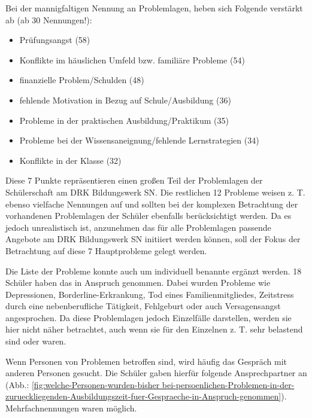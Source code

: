 \noindent
Bei der mannigfaltigen Nennung an Problemlagen, heben sich Folgende verstärkt ab (ab 30 Nennungen!): 

\begin{itemize}
	\item Prüfungsangst (58)
	\item Konflikte im häuslichen Umfeld bzw. familiäre Probleme (54)
	\item finanzielle Problem/Schulden (48)
	\item fehlende Motivation in Bezug auf Schule/Ausbildung (36)
	\item Probleme in der praktischen Ausbildung/Praktikum (35)
	\item Probleme bei der Wissensaneignung/fehlende Lernstrategien (34)
	\item Konflikte in der Klasse (32)
\end{itemize}

\noindent
Diese 7 Punkte repräsentieren einen großen Teil der Problemlagen der Schülerschaft am DRK Bildungswerk SN. Die restlichen 12 Probleme weisen z. T. ebenso vielfache Nennungen auf und sollten bei der komplexen Betrachtung der vorhandenen Problemlagen der Schüler ebenfalls berücksichtigt werden. Da es jedoch unrealistisch ist, anzunehmen das für alle Problemlagen passende Angebote am DRK Bildungswerk SN initiiert werden können, soll der Fokus der Betrachtung auf diese 7 Hauptprobleme gelegt werden.

Die Liste der Probleme konnte auch um individuell benannte ergänzt werden. 18 Schüler haben das in Anspruch genommen. Dabei wurden Probleme wie Depressionen, Borderline-Erkrankung, Tod eines Familienmitgliedes, Zeitstress durch eine nebenberufliche Tätigkeit, Fehlgeburt oder auch Versagensangst angesprochen. Da diese Problemlagen jedoch Einzelfälle darstellen, werden sie hier nicht näher betrachtet, auch wenn sie für den Einzelnen z. T. sehr belastend sind oder waren.

Wenn Personen von Problemen betroffen sind, wird häufig das Gespräch mit anderen Personen gesucht. Die Schüler gaben hierfür folgende Ansprechpartner an (Abb.: \ref{fig:welche-Personen-wurden-bisher bei-persoenlichen-Problemen-in-der-zurueckliegenden-Ausbildungszeit-fuer-Gespraeche-in-Anspruch-genommen}). Mehrfachnennungen waren möglich. 


